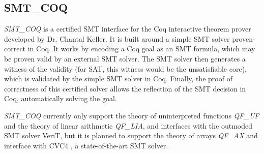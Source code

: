 \documentclass[onecolumn, preprint]{sigplanconf}
\begin{document}
\subsection{SMT\_COQ}
\emph{SMT\_COQ} is a certified SMT interface for the Coq interactive theorem prover developed by Dr. Chantal Keller. It is built around a simple SMT solver proven-correct in Coq.
It works by encoding a Coq goal as an SMT formula, which may be proven valid by an external SMT solver. The SMT solver then generates a witness of the validity (for SAT, this witness would be the unsatisfiable core), which is validated by the simple SMT solver in Coq. Finally, the proof of correctness of this certified solver allows the reflection of the SMT decision in Coq, automatically solving the goal.

\emph{SMT\_COQ} currently only support the theory of uninterpreted functions \emph{QF\_UF} and the theory of linear arithmetic \emph{QF\_LIA}, and interfaces with the outmoded SMT solver VeriT, but it is planned to support the theory of arrays \emph{QF\_AX} and interface with CVC4 \citep{CVC4}, a state-of-the-art SMT solver.

\end{document}
